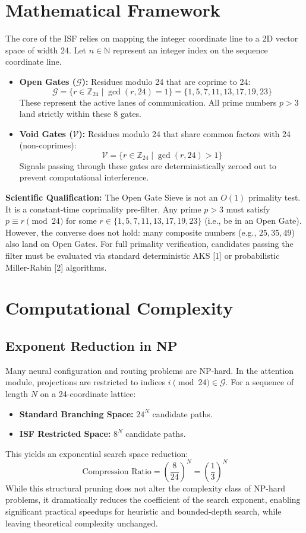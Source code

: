 \documentclass[11pt,twocolumn]{article}
\begin{document}
\section{Mathematical Framework}
The core of the ISF relies on mapping the integer coordinate line to a 2D vector space of width 24. Let $n \in \mathbb{N}$ represent an integer index on the sequence coordinate line.
\begin{itemize}
    \item \textbf{Open Gates ($\mathcal{G}$):} Residues modulo 24 that are coprime to 24:
    $$\mathcal{G} = \{r \in \mathbb{Z}_{24} \mid \gcd(r, 24) = 1\} = \{1, 5, 7, 11, 13, 17, 19, 23\}$$
    These represent the active lanes of communication. All prime numbers $p > 3$ land strictly within these 8 gates.
    \item \textbf{Void Gates ($\mathcal{V}$):} Residues modulo 24 that share common factors with 24 (non-coprimes):
    $$\mathcal{V} = \{r \in \mathbb{Z}_{24} \mid \gcd(r, 24) > 1\}$$
    Signals passing through these gates are deterministically zeroed out to prevent computational interference.
\end{itemize}

\textbf{Scientific Qualification:} The Open Gate Sieve is not an $O(1)$ primality test. It is a constant-time coprimality pre-filter. Any prime $p > 3$ must satisfy $p \equiv r \pmod{24}$ for some $r \in \{1, 5, 7, 11, 13, 17, 19, 23\}$ (i.e., be in an Open Gate). However, the converse does not hold: many composite numbers (e.g., $25, 35, 49$) also land on Open Gates. For full primality verification, candidates passing the filter must be evaluated via standard deterministic AKS [1] or probabilistic Miller-Rabin [2] algorithms.

\section{Computational Complexity}
\subsection{Exponent Reduction in NP}
Many neural configuration and routing problems are NP-hard. In the attention module, projections are restricted to indices $i \pmod{24} \in \mathcal{G}$. For a sequence of length $N$ on a 24-coordinate lattice:
\begin{itemize}
    \item \textbf{Standard Branching Space:} $24^N$ candidate paths.
    \item \textbf{ISF Restricted Space:} $8^N$ candidate paths.
\end{itemize}
This yields an exponential search space reduction:
$$\text{Compression Ratio} = \left(\frac{8}{24}\right)^N = \left(\frac{1}{3}\right)^N$$
While this structural pruning does not alter the complexity class of NP-hard problems, it dramatically reduces the coefficient of the search exponent, enabling significant practical speedups for heuristic and bounded-depth search, while leaving theoretical complexity unchanged.
\end{document}
